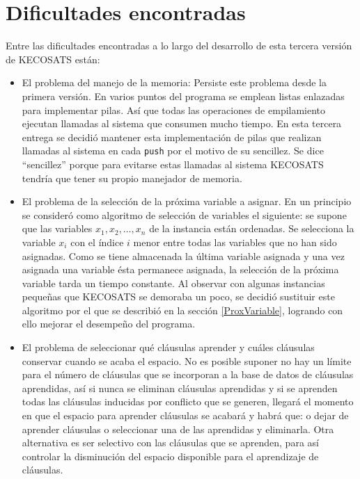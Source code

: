 \documentclass[12pt,lettersize,oneside]{article}
\begin{document}
\section{Dificultades encontradas}
Entre las dificultades encontradas a lo largo del desarrollo de esta tercera
versión de KECOSATS están:
\begin{itemize}
\item El problema del manejo de la memoria: Persiste este problema desde la
  primera versión. En varios puntos del programa se emplean listas enlazadas
  para implementar pilas. Así que todas las operaciones de empilamiento ejecutan
  llamadas al sistema que consumen mucho tiempo. En esta tercera entrega se
  decidió mantener esta implementación de pilas que realizan llamadas al sistema
  en cada {\tt push} por el motivo de su sencillez. Se dice ``sencillez'' porque
  para evitarse estas llamadas al sistema KECOSATS tendría que tener su propio
  manejador de memoria.
\item El problema de la selección de la próxima variable a asignar. En un
  principio se consideró como algoritmo de selección de variables el siguiente:
  se supone que las variables $x_1,x_2,\ldots,x_n$ de la instancia están
  ordenadas. Se selecciona la variable $x_i$ con el índice $i$ menor entre todas
  las variables que no han sido asignadas. Como se tiene almacenada la última
  variable asignada y una vez asignada una variable ésta permanece asignada, la
  selección de la próxima variable tarda un tiempo constante. Al observar con
  algunas instancias pequeñas que KECOSATS se demoraba un poco, se decidió
  sustituir este algoritmo por el que se describió en la sección
  \ref{ProxVariable}, logrando con ello mejorar el desempeño del programa.
\item El problema de seleccionar qué cláusulas aprender y cuáles cláusulas
  conservar cuando se acaba el espacio. No es posible suponer no hay un límite
  para el número de cláusulas que se incorporan a la base de datos de cláusulas
  aprendidas, así si nunca se eliminan cláusulas aprendidas y si se aprenden
  todas las cláusulas inducidas por conflicto que se generen, llegará el momento
  en que el espacio para aprender cláusulas se acabará y habrá que: o dejar de
  aprender cláusulas o seleccionar una de las aprendidas y eliminarla. Otra
  alternativa es ser selectivo con las cláusulas que se aprenden, para así
  controlar la disminución del espacio disponible para el aprendizaje de
  cláusulas.
\end{itemize}
\end{document}
